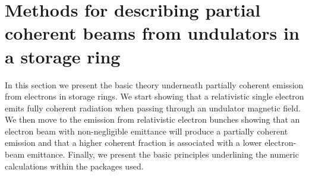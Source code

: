 \documentclass{iucr}              %
\begin{document}
\section{Methods for describing partial coherent beams from undulators in a storage ring}\label{sec:part_coh}

In this section we present the basic theory underneath partially coherent emission from electrons in storage rings. We start showing that a relativistic single electron emits fully coherent radiation when passing through an undulator magnetic field. We then move to the emission from relativistic electron bunches showing that an electron beam with non-negligible emittance will produce a partially coherent emission and that a higher coherent fraction is associated with a lower electron-beam emittance. Finally, we present the basic principles underlining the numeric calculations within the packages used.


\end{document}
